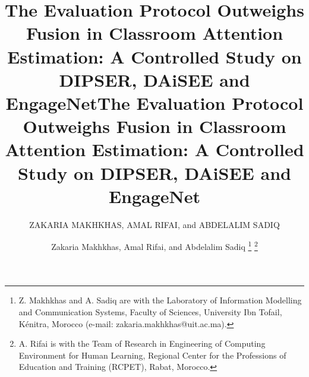 \IfFileExists{ieeeaccess.cls}{\documentclass{ieeeaccess}\newif\ifaccess\accesstrue}{\documentclass[journal]{IEEEtran}\newif\ifaccess\accessfalse}
\begin{document}
\ifaccess
{}
\title{The Evaluation Protocol Outweighs Fusion in Classroom Attention Estimation: A Controlled Study on DIPSER, DAiSEE and EngageNet}
\author{\uppercase{Zakaria Makhkhas}, \uppercase{Amal Rifai}, and \uppercase{Abdelalim Sadiq}}
\address[1]{Laboratory of Information Modelling and Communication Systems, Faculty of Sciences, University Ibn Tofail, K\'enitra, Morocco}
\address[2]{Team of Research in Engineering of Computing Environment for Human Learning, Regional Center for the Professions of Education and Training (RCPET), Rabat, Morocco}

\titlepgskip=-15pt
\maketitle
\else
\title{The Evaluation Protocol Outweighs Fusion in Classroom Attention Estimation: A Controlled Study on DIPSER, DAiSEE and EngageNet}
\author{Zakaria Makhkhas, Amal Rifai, and Abdelalim Sadiq%
\thanks{Z. Makhkhas and A. Sadiq are with the Laboratory of Information Modelling and Communication Systems, Faculty of Sciences, University Ibn Tofail, K\'enitra, Morocco (e-mail: zakaria.makhkhas@uit.ac.ma).}%
\thanks{A. Rifai is with the Team of Research in Engineering of Computing Environment for Human Learning, Regional Center for the Professions of Education and Training (RCPET), Rabat, Morocco.}}
\maketitle

\fi
\end{document}
